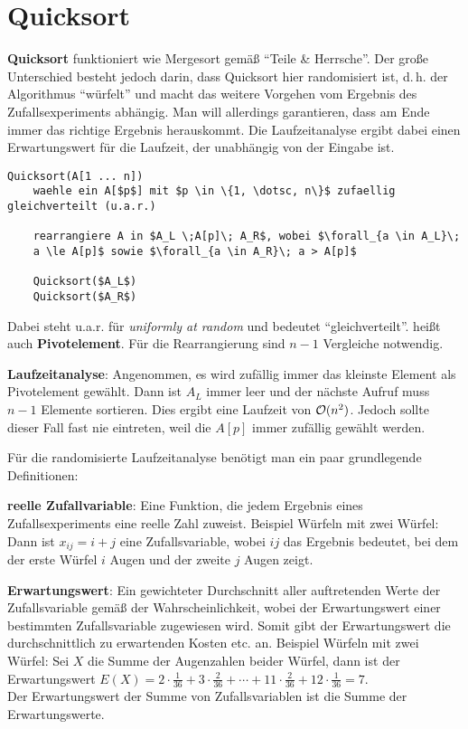 \section{%
    Quicksort%
}

\textbf{Quicksort} funktioniert wie Mergesort gemäß "`Teile \& Herrsche"'.
Der große Unterschied besteht jedoch darin, dass Quicksort hier randomisiert
ist, d.\,h. der Algorithmus "`würfelt"' und macht das weitere Vorgehen
vom Ergebnis des Zufallsexperiments abhängig.
Man will allerdings garantieren, dass am Ende immer das richtige Ergebnis
herauskommt.
Die Laufzeitanalyse ergibt dabei einen Erwartungswert für die Laufzeit,
der unabhängig von der Eingabe ist.

\begin{lstlisting}
Quicksort(A[1 ... n])
    waehle ein A[$p$] mit $p \in \{1, \dotsc, n\}$ zufaellig gleichverteilt (u.a.r.)

    rearrangiere A in $A_L \;A[p]\; A_R$, wobei $\forall_{a \in A_L}\;
    a \le A[p]$ sowie $\forall_{a \in A_R}\; a > A[p]$

    Quicksort($A_L$)
    Quicksort($A_R$)
\end{lstlisting}

Dabei steht u.a.r. für \emph{uniformly at random} und bedeutet
"`gleichverteilt"'.
 heißt auch \textbf{Pivotelement}.
Für die Rearrangierung sind $n - 1$ Vergleiche notwendig.

\linie

\textbf{Laufzeitanalyse}:
Angenommen, es wird zufällig immer das kleinste Element als Pivotelement
gewählt.
Dann ist $A_L$ immer leer und der nächste Aufruf muss $n - 1$ Elemente
sortieren.
Dies ergibt eine Laufzeit von $\mathcal{O}(n^2)$.
Jedoch sollte dieser Fall fast nie eintreten, weil die $A[p]$ immer zufällig
gewählt werden.

Für die randomisierte Laufzeitanalyse benötigt man ein paar grundlegende
Definitionen:

\textbf{reelle Zufallvariable}: Eine Funktion, die jedem Ergebnis eines
Zufallsexperiments eine reelle Zahl zuweist.
Beispiel Würfeln mit zwei Würfel:
Dann ist $x_{ij} = i + j$ eine Zufallsvariable, wobei $ij$ das Ergebnis
bedeutet, bei dem der erste Würfel $i$ Augen und der zweite $j$ Augen zeigt.

\textbf{Erwartungswert}: Ein gewichteter Durchschnitt aller auftretenden
Werte der Zufallsvariable gemäß der Wahrscheinlichkeit, wobei der
Erwartungswert einer bestimmten Zufallsvariable zugewiesen wird.
Somit gibt der Erwartungswert die durchschnittlich zu erwartenden Kosten
etc. an.
Beispiel Würfeln mit zwei Würfel:
Sei $X$ die Summe der Augenzahlen beider Würfel, dann ist
der Erwartungswert $E(X) = 2 \cdot \frac{1}{36} + 3 \cdot \frac{2}{36} +
\dotsb + 11 \cdot \frac{2}{36} + 12 \cdot \frac{1}{36} = 7$. \\
Der Erwartungswert der Summe von Zufallsvariablen ist die Summe
der Erwartungswerte.

